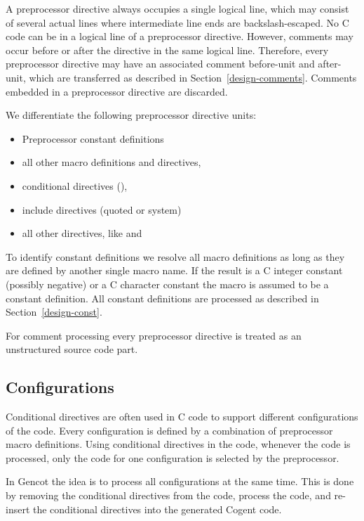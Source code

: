 
A preprocessor directive always occupies a single logical line, which may consist of several actual lines where 
intermediate line ends are backslash-escaped. No C code can be in a logical line of a preprocessor directive.
However, comments may occur before or after the directive in the same logical line. Therefore, every preprocessor 
directive may have an associated comment before-unit and after-unit, which are transferred as described in 
Section~\ref{design-comments}. Comments embedded in a preprocessor directive are discarded.

We differentiate the following preprocessor directive units:
\begin{itemize}
\item Preprocessor constant definitions
\item all other macro definitions and  directives,
\item conditional directives (),
\item include directives (quoted or system)
\item all other directives, like  and 
\end{itemize}

To identify constant definitions we resolve all macro definitions as long as they are defined by another single
macro name. If the result is a C integer constant (possibly negative) or a C character constant the macro is assumed
to be a constant definition. All constant definitions are processed
as described in Section~\ref{design-const}.

For comment processing every preprocessor directive is treated as an unstructured source code part.

\subsection{Configurations}
\label{design-preprocessor-config}

Conditional directives are often used in C code to support different configurations of the code. Every configuration
is defined by a combination of preprocessor macro definitions. Using conditional directives in the code, whenever the
code is processed, only the code for one configuration is selected by the preprocessor.

In Gencot the idea is to process all configurations at the same time. This is done by removing the conditional 
directives from the code, process the code, and re-insert the conditional directives into the generated Cogent code.

